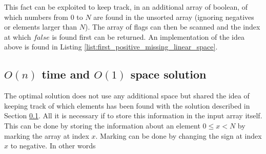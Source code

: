 This fact can be exploited to keep track, in an additional array of boolean, of which numbers from $0$ to $N$ are found in the unsorted array (ignoring negatives or elements larger than $N$). The array of flags can then be scanned and the index at which $false$ is found first can be returned. An implementation of the idea above is found in Listing \ref{list:first_positive_missing_linear_space}.




\subsection{$O(n)$ time and $O(1)$ space solution}
\label{first_positive_missing:sec:linear_space}
The optimal solution does not use any additional space but shared the idea of keeping track of which elements has been found with the solution described in Section \ref{first_positive_missing:sec:linear_space}. All it is necessary if to store this information in the input array itself. This can be done by storing the information about an element $0 \leq x < N$ by marking the array at index $x$. Marking can be done by changing the sign at index $x$ to negative.
In other words 

